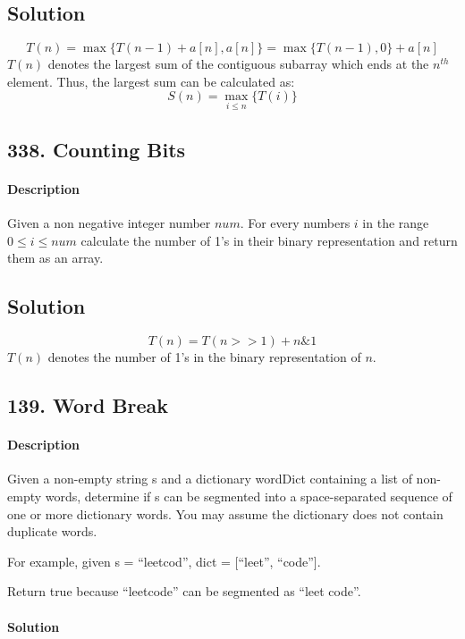 \documentclass{article}
\begin{document}
\subsection{Solution}

$$T(n)=\max\{T(n-1)+a[n],a[n]\}=\max\{T(n-1),0\}+a[n]$$
$T(n)$ denotes the largest sum of the contiguous subarray which ends at the $n^{th}$ element. Thus, the largest sum can be calculated as:
$$S(n)=\max_{i\leqslant n}\{T(i)\}$$

\subsection{338. Counting Bits}

\paragraph{Description}

Given a non negative integer number $num$. For every numbers $i$ in the range $0\leqslant i\leqslant num$ calculate the number of 1's in their binary representation and return them as an array.

\subsection{Solution}

$$T(n)=T(n>>1)+n\&1$$
$T(n)$ denotes the number of 1's in the binary representation of $n$.

\subsection{139. Word Break}

\paragraph{Description}

Given a non-empty string s and a dictionary wordDict containing a list of non-empty words, determine if s can be segmented into a space-separated sequence of one or more dictionary words. You may assume the dictionary does not contain duplicate words.

For example, given
s = ``leetcod'',
dict = [``leet'', ``code''].

Return true because ``leetcode'' can be segmented as ``leet code''.

\paragraph{Solution}
\end{document}
